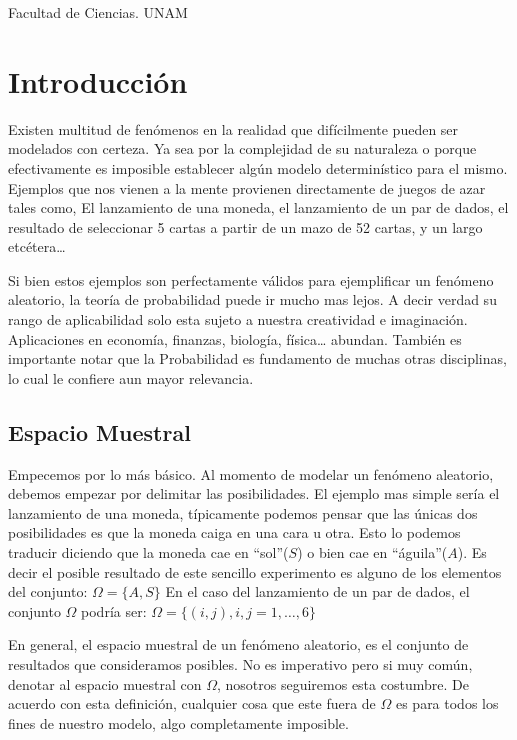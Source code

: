 \documentclass[14pt]{extreport}
\begin{document}
Facultad de Ciencias. UNAM

\chapter*{Introducción}

Existen multitud de fenómenos en la realidad que difícilmente pueden ser modelados con certeza. Ya sea por la complejidad de su naturaleza o
porque efectivamente es imposible establecer algún modelo determinístico para el mismo. Ejemplos que nos vienen a la mente provienen directamente
de juegos de azar tales como, El lanzamiento de una moneda, el lanzamiento de un par de dados, el resultado de seleccionar 5 cartas a partir de un mazo de 52 cartas, y un largo etcétera\ldots{}

Si bien estos ejemplos son perfectamente válidos para ejemplificar un fenómeno aleatorio, la teoría de probabilidad puede ir mucho mas lejos. A decir verdad su rango de aplicabilidad solo esta sujeto a nuestra creatividad e imaginación. Aplicaciones en economía, finanzas, biología, física\dots{} abundan. También es importante notar que la Probabilidad es fundamento de muchas otras disciplinas, lo cual le confiere aun mayor relevancia.


\section{Espacio Muestral}

Empecemos por lo más básico. Al momento de modelar un fenómeno aleatorio, debemos empezar por delimitar las posibilidades. El ejemplo mas simple sería el lanzamiento de una moneda, típicamente podemos pensar que las únicas dos posibilidades es que la moneda caiga en una cara u otra. Esto lo podemos traducir diciendo que la moneda cae en ``sol''($S$) o bien cae en ``águila''($A$). Es decir el posible resultado de este sencillo experimento es alguno de los elementos del conjunto: $\Omega = \{A, S\}$ En el caso del lanzamiento de un par de dados, el conjunto $\Omega$ podría ser: $\Omega = \{(i , j), i , j = 1,\ldots , 6\}$

En general, el espacio muestral de un fenómeno aleatorio, es el conjunto de resultados que consideramos posibles. No es imperativo pero si muy común, denotar al espacio muestral con $\Omega$, nosotros seguiremos esta costumbre. De acuerdo con esta definición, cualquier cosa que este fuera de $\Omega$ es para todos los fines de nuestro modelo, algo completamente imposible.
\end{document}
